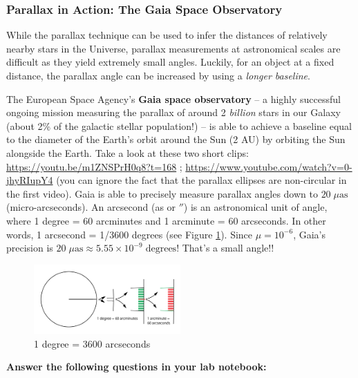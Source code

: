 \documentclass[11pt]{article}
\begin{document}
\subsubsection{Parallax in Action: The Gaia Space Observatory}

While the parallax technique can be used to infer the distances of relatively nearby stars in the Universe, parallax measurements at astronomical scales are difficult as they yield extremely small angles. Luckily, for an object at a fixed distance, the parallax angle can be increased by using a \emph{longer baseline}. 

\medskip \noindent
The European Space Agency's \textbf{Gaia space observatory} -- a highly successful ongoing mission measuring the parallax of around 2 \emph{billion} stars in our Galaxy (about 2\% of the galactic stellar population!) -- is able to achieve a baseline equal to the diameter of the Earth's orbit around the Sun (2 AU) by orbiting the Sun alongside the Earth. Take a look at these two short clips: \url{https://youtu.be/m1ZNSPrH0q8?t=168} ;  \url{https://www.youtube.com/watch?v=0-jhyRIupY4} (you can ignore the fact that the parallax ellipses are non-circular in the first video). Gaia is able to precisely measure parallax angles down to $20\;\mu\mathrm{as}$ (micro-arcseconds). An arcsecond (as or $''$) is an astronomical unit of angle, where 1 degree = 60 arcminutes and 1 arcminute = 60 arcseconds. In other words, 1 arcsecond = 1/3600 degrees (see Figure \ref{fig:arcunits}). Since $\mu = 10^{-6}$, Gaia's precision is $20\;\mu\mathrm{as}\approx 5.55\times 10^{-9}\;\mathrm{degrees}$! That's a small angle!!

\begin{figure}
    \centering
    \includegraphics[width=0.5\textwidth]{Images/blog014-image001-degree-arcmin-arcsec.png}
    \caption{1 degree = 3600 arcseconds}
    \label{fig:arcunits}
\end{figure}
\medskip \noindent
\textbf{Answer the following questions in your lab notebook:}
\end{document}
